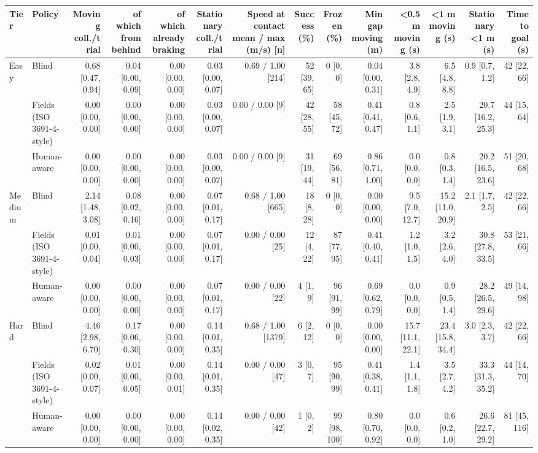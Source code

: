 \begin{tabular}{llrrrrrrrrrrrr}
\toprule
Tier & Policy & Moving coll./trial & of which from behind & of which already braking & Stationary coll./trial & Speed at contact mean / max (m/s) [n] & Success (\%) & Frozen (\%) & Min gap moving (m) & <0.5 m moving (s) & <1 m moving (s) & Stationary <1 m (s) & Time to goal (s) \\
\midrule
Easy & Blind & 0.68 [0.47, 0.94] & 0.04 [0.00, 0.09] & 0.00 [0.00, 0.00] & 0.03 [0.00, 0.07] & 0.69 / 1.00 [214] & 52 [39, 65] & 0 [0, 0] & 0.04 [0.00, 0.31] & 3.8 [2.8, 4.9] & 6.5 [4.8, 8.8] & 0.9 [0.7, 1.2] & 42 [22, 66] \\
 & Fields (ISO 3691-4-style) & 0.00 [0.00, 0.00] & 0.00 [0.00, 0.00] & 0.00 [0.00, 0.00] & 0.03 [0.00, 0.07] & 0.00 / 0.00 [9] & 42 [28, 55] & 58 [45, 72] & 0.41 [0.41, 0.47] & 0.8 [0.6, 1.1] & 2.5 [1.9, 3.1] & 20.7 [16.2, 25.3] & 44 [15, 64] \\
 & Human-aware & 0.00 [0.00, 0.00] & 0.00 [0.00, 0.00] & 0.00 [0.00, 0.00] & 0.03 [0.00, 0.07] & 0.00 / 0.00 [9] & 31 [19, 44] & 69 [56, 81] & 0.86 [0.71, 1.00] & 0.0 [0.0, 0.0] & 0.8 [0.3, 1.4] & 20.2 [16.5, 23.6] & 51 [20, 68] \\
\midrule
Medium & Blind & 2.14 [1.48, 3.08] & 0.08 [0.02, 0.16] & 0.00 [0.00, 0.00] & 0.07 [0.01, 0.17] & 0.68 / 1.00 [665] & 18 [8, 28] & 0 [0, 0] & 0.00 [0.00, 0.00] & 9.5 [7.0, 12.7] & 15.2 [11.0, 20.9] & 2.1 [1.7, 2.5] & 42 [22, 66] \\
 & Fields (ISO 3691-4-style) & 0.01 [0.00, 0.04] & 0.01 [0.00, 0.03] & 0.00 [0.00, 0.00] & 0.07 [0.01, 0.17] & 0.00 / 0.00 [25] & 12 [4, 22] & 87 [77, 95] & 0.41 [0.40, 0.41] & 1.2 [1.0, 1.5] & 3.2 [2.6, 4.0] & 30.8 [27.8, 33.5] & 53 [21, 66] \\
 & Human-aware & 0.00 [0.00, 0.00] & 0.00 [0.00, 0.00] & 0.00 [0.00, 0.00] & 0.07 [0.01, 0.17] & 0.00 / 0.00 [22] & 4 [1, 9] & 96 [91, 99] & 0.69 [0.62, 0.79] & 0.0 [0.0, 0.0] & 0.9 [0.5, 1.4] & 28.2 [26.5, 29.6] & 49 [14, 98] \\
\midrule
Hard & Blind & 4.46 [2.98, 6.70] & 0.17 [0.06, 0.30] & 0.00 [0.00, 0.00] & 0.14 [0.01, 0.35] & 0.68 / 1.00 [1379] & 6 [2, 12] & 0 [0, 0] & 0.00 [0.00, 0.00] & 15.7 [11.1, 22.1] & 23.4 [15.8, 34.4] & 3.0 [2.3, 3.7] & 42 [22, 66] \\
 & Fields (ISO 3691-4-style) & 0.02 [0.00, 0.07] & 0.01 [0.00, 0.05] & 0.00 [0.00, 0.01] & 0.14 [0.01, 0.35] & 0.00 / 0.00 [47] & 3 [0, 7] & 95 [90, 99] & 0.41 [0.38, 0.41] & 1.4 [1.1, 1.8] & 3.5 [2.7, 4.2] & 33.3 [31.3, 35.2] & 44 [14, 70] \\
 & Human-aware & 0.00 [0.00, 0.00] & 0.00 [0.00, 0.00] & 0.00 [0.00, 0.00] & 0.14 [0.02, 0.35] & 0.00 / 0.00 [42] & 1 [0, 2] & 99 [98, 100] & 0.80 [0.70, 0.92] & 0.0 [0.0, 0.0] & 0.6 [0.2, 1.0] & 26.6 [22.7, 29.2] & 81 [45, 116] \\
\bottomrule
\end{tabular}
